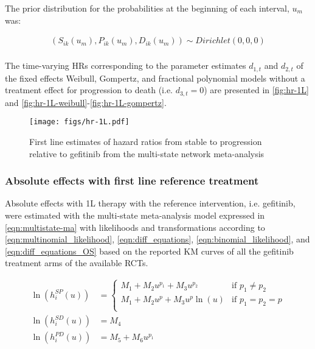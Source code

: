 \documentclass[11pt,final,fleqn]{article}\usepackage[]{graphicx}\usepackage[]{color}
\theoremstyle{plain}
\newcounter{subsubsubsection}[subsubsection]
\begin{document}
{The prior distribution for the probabilities at the beginning of each interval, $u_{m}$ was: 

\begin{equation} \label{eqn:multinomial-prior}
\begin{aligned}
(S_{ik}(u_{m}),P_{ik}(u_{m}),D_{ik}(u_{m})) \sim Dirichlet(0,0,0) \\
\end{aligned}
\end{equation}

The time-varying HRs corresponding to the parameter estimates  ${d_{1,t}}$ and ${d_{2,t}}$   of the fixed effects Weibull, Gompertz, and fractional polynomial models without a treatment effect for progression to death (i.e. ${d_{3,t}=0}$) are presented in \autoref{fig:hr-1L} and \autoref{fig:hr-1L-weibull}-\autoref{fig:hr-1L-gompertz}.


\begin{figure}[h]
\centering
\texttt{[image: figs/hr-1L.pdf]} 
\caption{First line estimates of hazard ratios from stable to progression relative to gefitinib from the multi-state network meta-analysis}\label{fig:hr-1L}
\end{figure}

\FloatBarrier

\subsubsection{Absolute effects with first line reference treatment}
Absolute effects with 1L therapy with the reference intervention, i.e. gefitinib, were estimated with the multi-state meta-analysis model expressed in \autoref{eqn:multistate-ma} with likelihoods and transformations according to \autoref{eqn:multinomial_likelihood}, \autoref{eqn:diff_equations}, \autoref{eqn:binomial_likelihood}, and \autoref{eqn:diff_equations_OS} based on the reported KM curves of all the gefitinib treatment arms of the available RCTs.

\begin{equation}\label{eqn:multistate-ma}
\begin{aligned} 
\ln\left(h_{i}^{SP}(u)\right) &= 
\begin{cases}
M_{1} + M_{2}u^{p_1} + M_{3}u^{p_2} & \text{if } p_1 \neq p_2 \\ 
M_{1} + M_{2}u^{p} + M_{3}u^{p}\ln(u) & \text{if } p_1 = p_2 = p \\ 
\end{cases}\\ 
\ln\left(h_{i}^{SD}(u)\right) &=
M_{4}\\
\ln\left(h_{i}^{PD}(u)\right) &=
M_{5} + M_{6}u^{p_1}\\ 
\\
\end{aligned}
\end{equation}

}
\end{document}

